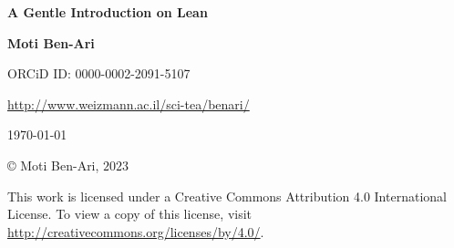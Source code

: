 
\thispagestyle{empty}

\begin{center}
\textbf{\LARGE A Gentle Introduction on Lean}

\bigskip
\bigskip
\bigskip

\textbf{\Large Moti Ben-Ari}

\bigskip

{\small ORCiD ID: 0000-0002-2091-5107}

\bigskip

\url{http://www.weizmann.ac.il/sci-tea/benari/}

\bigskip
\bigskip

\today

\end{center}

\vfill

\begin{center}
\copyright{} Moti Ben-Ari, $2023$
\end{center}
 
\begin{small}
This work is licensed under a Creative Commons Attribution 4.0 International License. To view a copy of this license, visit \url{http://creativecommons.org/licenses/by/4.0/}.
\end{small}

\newpage

\tableofcontents
